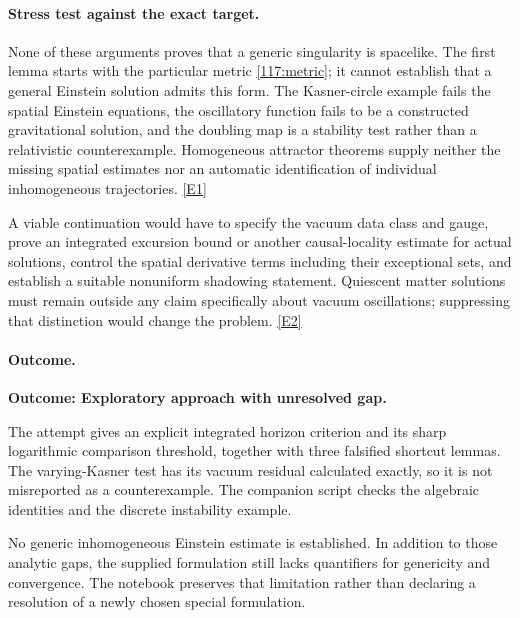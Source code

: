 \documentclass[11pt,a4paper]{article}
\newcommand{\eref}[2]{\hyperlink{extra:#1:#2}{[E#2]}}
\numberwithin{equation}{section}
\begin{document}
\paragraph{Stress test against the exact target.}
None of these arguments proves that a generic singularity is spacelike.
The first lemma starts with the particular metric \eqref{117:metric}; it
cannot establish that a general Einstein solution admits this form. The
Kasner-circle example fails the spatial Einstein equations, the oscillatory
function fails to be a constructed gravitational solution, and the doubling
map is a stability test rather than a relativistic counterexample.
Homogeneous attractor theorems supply neither the missing spatial estimates
nor an automatic identification of individual inhomogeneous trajectories.
\eref{117}{1}

A viable continuation would have to specify the vacuum data class and gauge,
prove an integrated excursion bound or another causal-locality estimate for
actual solutions, control the spatial derivative terms including their
exceptional sets, and establish a suitable nonuniform shadowing statement.
Quiescent matter solutions must remain outside any claim specifically about
vacuum oscillations; suppressing that distinction would change the problem.
\eref{117}{2}

\paragraph{Outcome.}
\textbf{Outcome: Exploratory approach with unresolved gap.}

The attempt gives an explicit integrated horizon criterion and its sharp
logarithmic comparison threshold, together with three falsified shortcut
lemmas. The varying-Kasner test has its vacuum residual calculated exactly,
so it is not misreported as a counterexample. The companion script checks
the algebraic identities and the discrete instability example.

No generic inhomogeneous Einstein estimate is established. In addition to
those analytic gaps, the supplied formulation still lacks quantifiers for
genericity and convergence. The notebook preserves that limitation rather
than declaring a resolution of a newly chosen special formulation.
\end{document}
